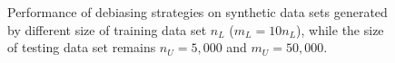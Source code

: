 \begin{figure}[!t]
  \centering
  \caption{\label{fig:trainratio}
  Performance of debiasing strategies on synthetic data sets 
  generated by different size of training data set $n_L$ ($m_L=10n_L$), 
  while the size of testing data set remains $n_U=5,000$ and $m_U=50,000$.
  }
\end{figure}

